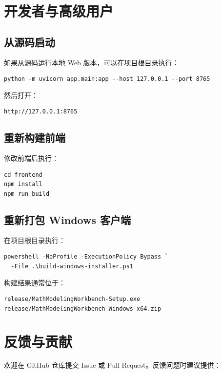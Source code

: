 \documentclass[UTF8,a4paper,12pt]{ctexart}
\begin{document}
\section{开发者与高级用户}

\subsection{从源码启动}

如果从源码运行本地 Web 版本，可以在项目根目录执行：

\begin{verbatim}
python -m uvicorn app.main:app --host 127.0.0.1 --port 8765
\end{verbatim}

然后打开：

\begin{verbatim}
http://127.0.0.1:8765
\end{verbatim}

\subsection{重新构建前端}

修改前端后执行：

\begin{verbatim}
cd frontend
npm install
npm run build
\end{verbatim}

\subsection{重新打包 Windows 客户端}

在项目根目录执行：

\begin{verbatim}
powershell -NoProfile -ExecutionPolicy Bypass `
  -File .\build-windows-installer.ps1
\end{verbatim}

构建结果通常位于：

\begin{verbatim}
release/MathModelingWorkbench-Setup.exe
release/MathModelingWorkbench-Windows-x64.zip
\end{verbatim}

\section{反馈与贡献}

欢迎在 GitHub 仓库提交 Issue 或 Pull Request。反馈问题时建议提供：
\end{document}
